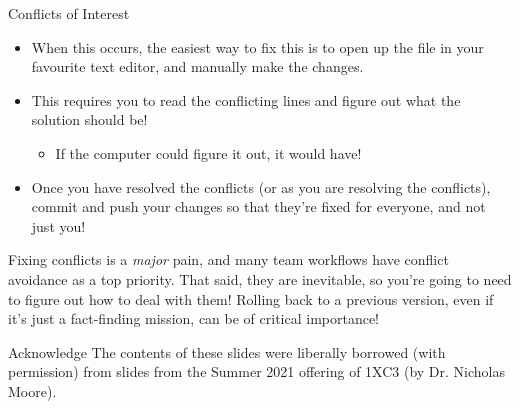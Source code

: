 \documentclass[11pt]{beamer}
\begin{document}
\begin{frame}{Conflicts of Interest}
\begin{itemize}
\item When this occurs, the easiest way to fix this is to open up the file in your favourite text editor, and manually make the changes.
\item This requires you to read the conflicting lines and figure out what the solution should be! 
\begin{itemize}
\item If the computer could figure it out, it would have! 
\end{itemize}
\item Once you have resolved the conflicts (or as you are resolving the conflicts), commit and push your changes so that they're fixed for everyone, and not just you! 
\end{itemize}
Fixing conflicts is a \emph{major} pain, and many team workflows have conflict avoidance as a top priority.  
That said, they are inevitable, so you're going to need to figure out how to deal with them!  Rolling back to a previous version, even if it's just a fact-finding mission, can be of critical importance!
\end{frame}


\begin{frame}{Acknowledge}
\center
\vspace{8em}
The contents of these slides were liberally borrowed (with permission) from slides from the Summer 2021 offering of 1XC3 (by Dr. Nicholas Moore).  
\end{frame}
\end{document}
